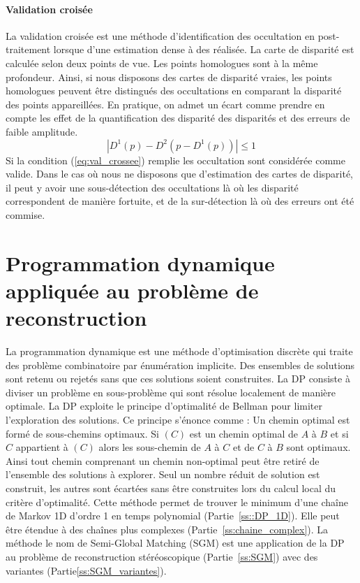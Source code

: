 \documentclass[../main/These_Mathias_Paget.tex]{subfiles}
\begin{document}
\paragraph*{Validation croisée}
La validation croisée est une méthode d’identification des occultation en post-traitement lorsque d'une estimation dense à des réalisée. La carte de disparité est calculée selon deux points de vue. Les points homologues sont à la même profondeur. Ainsi, si nous disposons des cartes de disparité vraies, les points homologues peuvent être distingués des occultations en comparant la disparité des points appareillées. En pratique, on admet un écart comme prendre en compte les effet de la quantification des disparité des disparités et des erreurs de faible amplitude.
\begin{equation}
|D^1(p) - D^2(p- D^1(p))| \leq 1
\label{eq:val_crossee}
\end{equation}
Si la condition (\ref{eq:val_crossee}) remplie les occultation sont considérée comme valide. Dans le cas où nous ne disposons que d’estimation des cartes de disparité, il peut y avoir une sous-détection des occultations là où les disparité correspondent de manière fortuite, et de la sur-détection là où des erreurs ont été commise.

\section{Programmation dynamique appliquée au problème de reconstruction}

La programmation dynamique est une méthode d'optimisation discrète qui traite des problème combinatoire par énumération implicite. Des ensembles de solutions sont retenu ou rejetés sans que ces solutions soient construites. La DP consiste à diviser un problème en sous-problème qui sont résolue localement de manière optimale. La DP exploite le principe d'optimalité de Bellman pour limiter l'exploration des solutions. Ce principe s’énonce comme : Un chemin optimal est formé de sous-chemins optimaux. Si $(C)$ est un chemin optimal de $A$ à $B$ et si $C$ appartient à $(C)$ alors les sous-chemin de $A$ à $C$ et de $C$ à $B$ sont optimaux. Ainsi tout chemin comprenant un chemin non-optimal peut être retiré de l'ensemble des solutions à explorer. Seul un nombre réduit de solution est construit, les autres sont écartées sans être construites lors du calcul local du critère d'optimalité. Cette méthode permet de trouver le minimum d'une chaîne de Markov 1D d'ordre 1 en temps polynomial (Partie~\ref{ss::DP_1D}). Elle peut être étendue à des chaînes plus complexes (Partie~\ref{ss:chaine_complex}). La méthode le nom de Semi-Global Matching (SGM) est une application de la DP au problème de reconstruction stéréoscopique (Partie~\ref{ss:SGM}) avec des variantes (Partie\ref{ss:SGM_variantes}).
\end{document}
